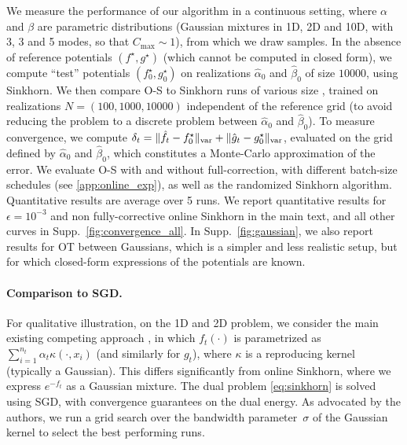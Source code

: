 We measure the performance of our algorithm in a
 continuous setting, where $\alpha$ and $\beta$ are  parametric
distributions (Gaussian mixtures in 1D, 2D and 10D, with 3, 3 and 5 modes, so
that $C_{\max} \sim 1$), from which we draw samples. In the absence of reference
potentials $(f^\star, g^\star)$ (which cannot be computed in closed form),
we compute ``test'' potentials $(f^\star_0, g^\star_0)$ on realizations $\hat
\alpha_0$ and $\hat \beta_0$ of size $10000$, using Sinkhorn. We then compare
O-S to Sinkhorn runs of various size , trained on realizations $N=(100,1000,
10000)$ independent of the reference grid (to avoid reducing the problem to a
discrete problem between $\hat \alpha_0$ and $\hat \beta_0$). To measure
convergence, we compute $\delta_t = \Vert \hat f_t - f^\star_0 \Vert_{\text{\upshape var}} +
\Vert \hat g_t -  g_0^\star \Vert_{\text{\upshape var}}$, evaluated on the grid defined by
$\hat \alpha_0$ and $\hat \beta_0$, which constitutes a Monte-Carlo approximation of the error.
%
We evaluate O-S with and without full-correction, with
different batch-size schedules (see \autoref{app:online_exp}), as well as the randomized Sinkhorn algorithm. Quantitative results are average over 5 runs. We report quantitative results for $\epsilon = 10^{-3}$ and non fully-corrective online Sinkhorn in the main text, and all other curves in Supp.~\autoref{fig:convergence_all}. In
Supp.~\autoref{fig:gaussian}, we also report results for OT between Gaussians, which is a simpler and less realistic setup, but for which closed-form expressions of the potentials are known.

\paragraph{Comparison to SGD.}\label{sec:compare}
%
For qualitative illustration, on the 1D and 2D problem, we consider the main existing competing
approach \citep{2016-genevay-nips}, in which $f_t(\cdot)$ is parametrized as
$\sum_{i=1}^{n_t} \alpha_t \kappa(\cdot, x_i)$ (and similarly for $g_t$), where
$\kappa$ is a reproducing kernel (typically a Gaussian). This differs
significantly from online Sinkhorn, where we express $e^{-f_t}$ as a Gaussian
mixture. The dual problem \eqref{eq:sinkhorn} is solved using SGD, with convergence guarantees on the dual energy.  As advocated
by the authors, we run a grid search over the bandwidth parameter~$\sigma$ of
the Gaussian kernel to select the best performing runs.


